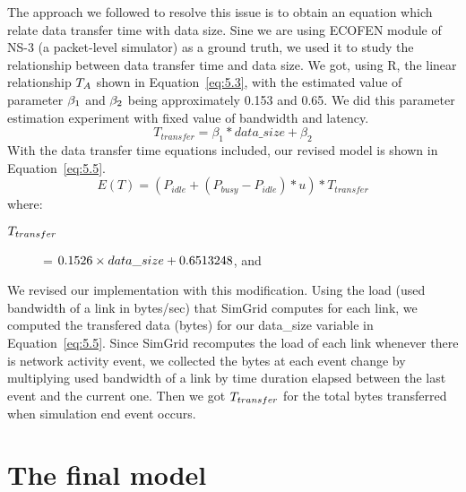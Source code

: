 The approach we followed to resolve this issue is to obtain an equation which relate data transfer time with data size. Sine we are using ECOFEN module of NS-3 (a packet-level simulator) as a ground truth, we used it to study the relationship between data transfer time and data size. We got, using R, the linear relationship \($$T_{A}$$\) shown in Equation~\ref{eq:5.3}, with the estimated value of parameter \($$\beta_1$$\) and \($$\beta_2$$\) being approximately 0.153 and 0.65. We did this parameter estimation experiment with fixed value of bandwidth and latency.
\begin{equation} \label{eq:5.3}
T_{transfer} = \beta_1 * data\_size + \beta_2
\end{equation} 
With the data transfer time equations included, our revised model is shown in Equation~\ref{eq:5.5}.
\begin{equation} \label{eq:5.5}
E(T) = (P_{idle} + (P_{busy} - P_{idle}) * u ) * T_{transfer}
\end{equation} 
where:
\begin{description}
	\item [\($$T_{transfer}$$\)] = \($$0.1526 \times data\_size +0.6513248$$\), and 
\end{description} 
We revised our implementation with this modification. Using the load (used bandwidth of a link in bytes/sec) that SimGrid computes for each link, we computed the transfered data (bytes) for our data\_size variable in Equation~\ref{eq:5.5}. Since SimGrid recomputes the load of each link whenever there is network activity event, we collected the bytes at each event change by multiplying used bandwidth of a link by time duration elapsed between the last event and the current one. Then we got \($$T_{transfer}$$\) for the total bytes transferred when simulation end event occurs. 
\section{The final model}

